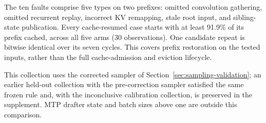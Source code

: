 The ten faults comprise five types on two prefixes: omitted convolution gathering, omitted recurrent replay, incorrect KV remapping, stale root input, and sibling-state publication. Every cache-resumed case starts with at least 91.9\% of its prefix cached, across all five arms (30 observations). One candidate repeat is bitwise identical over its seven cycles. This covers prefix restoration on the tested inputs, rather than the full cache-admission and eviction lifecycle.

This collection uses the corrected sampler of Section~\ref{sec:sampling-validation}; an earlier held-out collection with the pre-correction sampler satisfied the same frozen rule and, with the inconclusive calibration collection, is preserved in the supplement. MTP drafter state and batch sizes above one are outside this comparison.
